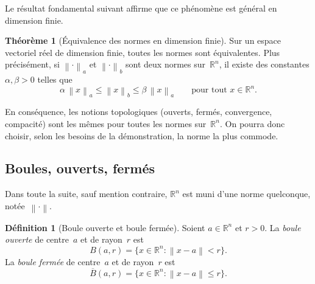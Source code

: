 \documentclass[12pt,a4paper,openany]{book}
\theoremstyle{definition}
\newtheorem{definition}{Définition}[chapter]
\newtheorem{theoreme}{Théorème}[chapter]
\newcommand{\R}{\mathbb{R}}
\newcommand{\norm}[1]{\left\lVert #1 \right\rVert}
\begin{document}
Le résultat fondamental suivant affirme que ce phénomène est général en dimension finie.

\begin{theoreme}[Équivalence des normes en dimension finie]
  \label{thm:equivalence-normes}
  Sur un espace vectoriel réel de dimension finie, toutes les normes sont équivalentes. Plus précisément, si $\norm{\cdot}_a$ et $\norm{\cdot}_b$ sont deux normes sur~$\R^n$, il existe des constantes $\alpha, \beta > 0$ telles que
  \[
    \alpha \, \norm{x}_a \leqslant \norm{x}_b \leqslant \beta \, \norm{x}_a
    \qquad \text{pour tout } x \in \R^n.
  \]
\end{theoreme}

En conséquence, les notions topologiques (ouverts, fermés, convergence, compacité) sont les mêmes pour toutes les normes sur~$\R^n$. On pourra donc choisir, selon les besoins de la démonstration, la norme la plus commode.

\begin{center}
\end{center}

\subsection{Boules, ouverts, fermés}
\label{subsec:boules-ouverts-fermes}

Dans toute la suite, sauf mention contraire, $\R^n$ est muni d'une norme quelconque, notée~$\norm{\cdot}$.

\begin{definition}[Boule ouverte et boule fermée]\label{def:boules}
  Soient $a \in \R^n$ et $r > 0$. La \emph{boule ouverte} de centre~$a$ et de rayon~$r$ est
  \[
    B(a, r) = \{ x \in \R^n : \norm{x - a} < r \}.
  \]
  La \emph{boule fermée} de centre~$a$ et de rayon~$r$ est
  \[
    \overline{B}(a, r) = \{ x \in \R^n : \norm{x - a} \leqslant r \}.
  \]
\end{definition}
\end{document}
